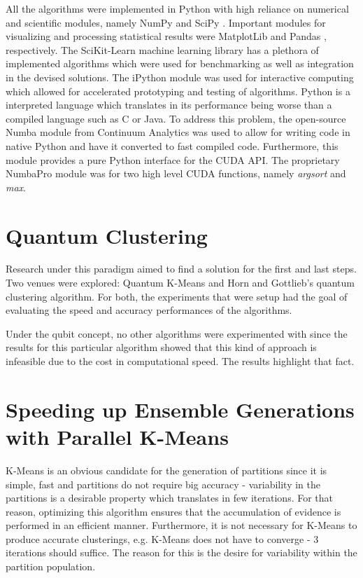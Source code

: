 All the algorithms were implemented in Python with high reliance on numerical and scientific modules, namely NumPy \cite{VanDerWalt2011} and SciPy \cite{JonesSciPy,Oliphant2007,Millman2011}.
Important modules for visualizing and processing statistical results were MatplotLib \cite{hunter2007matplotlib} and Pandas \cite{McKinney2010}, respectively.
The SciKit-Learn \cite{Pedregosa2012} machine learning library has a plethora of implemented algorithms which were used for benchmarking as well as integration in the devised solutions.
The iPython \cite{Perez2007} module was used for interactive computing which allowed for accelerated prototyping and testing of algorithms.
Python is a interpreted language which translates in its performance being worse than a compiled language such as C or Java.
To address this problem, the open-source Numba module from Continuum Analytics was used to allow for writing code in native Python and have it converted to fast compiled code.
Furthermore, this module provides a pure Python interface for the CUDA API.
The proprietary NumbaPro module was for two high level CUDA functions, namely \emph{argsort} and \emph{max}. %


\section{Quantum Clustering}

Research under this paradigm aimed to find a solution for the first and last steps.
Two venues were explored: Quantum K-Means and Horn and Gottlieb's quantum clustering algorithm.
For both, the experiments that were setup had the goal of evaluating the speed and accuracy performances of the algorithms.

Under the qubit concept, no other algorithms were experimented with since the results for this particular algorithm showed that this kind of approach is infeasible due to the cost in computational speed.
The results highlight that fact.

\section{Speeding up Ensemble Generations with Parallel K-Means}
K-Means is an obvious candidate for the generation of partitions since it is simple, fast and partitions do not require big accuracy - variability in the partitions is a desirable property which translates in few iterations.
For that reason, optimizing this algorithm ensures that the accumulation of evidence is performed in an efficient manner.
Furthermore, it is not necessary for K-Means to produce accurate clusterings, e.g. K-Means does not have to converge - 3 iterations should suffice.
The reason for this is the desire for variability within the partition population.


